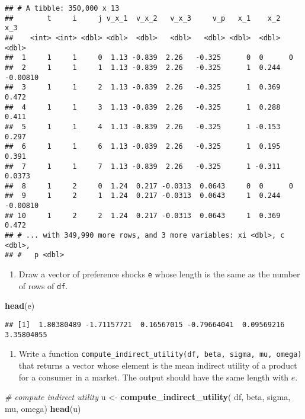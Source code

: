 \documentclass[
]{book}
\newenvironment{Shaded}{\begin{snugshade}}{\end{snugshade}}
\newcommand{\CommentTok}[1]{\textcolor[rgb]{0.56,0.35,0.01}{\textit{#1}}}
\newcommand{\KeywordTok}[1]{\textcolor[rgb]{0.13,0.29,0.53}{\textbf{#1}}}
\newcommand{\NormalTok}[1]{#1}
\newcommand{\StringTok}[1]{\textcolor[rgb]{0.31,0.60,0.02}{#1}}
\providecommand{\tightlist}{%
  \setlength{\itemsep}{0pt}\setlength{\parskip}{0pt}}
\begin{document}
\begin{verbatim}
## # A tibble: 350,000 x 13
##        t     i     j v_x_1  v_x_2   v_x_3     v_p   x_1    x_2      x_3
##    <int> <int> <dbl> <dbl>  <dbl>   <dbl>   <dbl> <dbl>  <dbl>    <dbl>
##  1     1     1     0  1.13 -0.839  2.26   -0.325      0  0      0      
##  2     1     1     1  1.13 -0.839  2.26   -0.325      1  0.244 -0.00810
##  3     1     1     2  1.13 -0.839  2.26   -0.325      1  0.369  0.472  
##  4     1     1     3  1.13 -0.839  2.26   -0.325      1  0.288  0.411  
##  5     1     1     4  1.13 -0.839  2.26   -0.325      1 -0.153  0.297  
##  6     1     1     6  1.13 -0.839  2.26   -0.325      1  0.195  0.391  
##  7     1     1     7  1.13 -0.839  2.26   -0.325      1 -0.311  0.0373 
##  8     1     2     0  1.24  0.217 -0.0313  0.0643     0  0      0      
##  9     1     2     1  1.24  0.217 -0.0313  0.0643     1  0.244 -0.00810
## 10     1     2     2  1.24  0.217 -0.0313  0.0643     1  0.369  0.472  
## # ... with 349,990 more rows, and 3 more variables: xi <dbl>, c <dbl>,
## #   p <dbl>
\end{verbatim}

\begin{enumerate}
\def\labelenumi{\arabic{enumi}.}
\setcounter{enumi}{5}
\tightlist
\item
  Draw a vector of preference shocks \texttt{e} whose length is the same as the number of rows of \texttt{df}.
\end{enumerate}

\begin{Shaded}
\begin{Highlighting}[]
\KeywordTok{head}\NormalTok{(e)}
\end{Highlighting}
\end{Shaded}

\begin{verbatim}
## [1]  1.80380489 -1.71157721  0.16567015 -0.79664041  0.09569216  3.35804055
\end{verbatim}

\begin{enumerate}
\def\labelenumi{\arabic{enumi}.}
\setcounter{enumi}{6}
\tightlist
\item
  Write a function \texttt{compute\_indirect\_utility(df,\ beta,\ sigma,\ mu,\ omega)} that returns a vector whose element is the mean indirect utility of a product for a consumer in a market. The output should have the same length with \(e\).
\end{enumerate}

\begin{Shaded}
\begin{Highlighting}[]
\CommentTok{# compute indirect utility}
\NormalTok{u <-}\StringTok{ }
\StringTok{  }\KeywordTok{compute_indirect_utility}\NormalTok{(}
\NormalTok{    df, beta, sigma, }
\NormalTok{           mu, omega)}
\KeywordTok{head}\NormalTok{(u)}
\end{Highlighting}
\end{Shaded}
\end{document}
